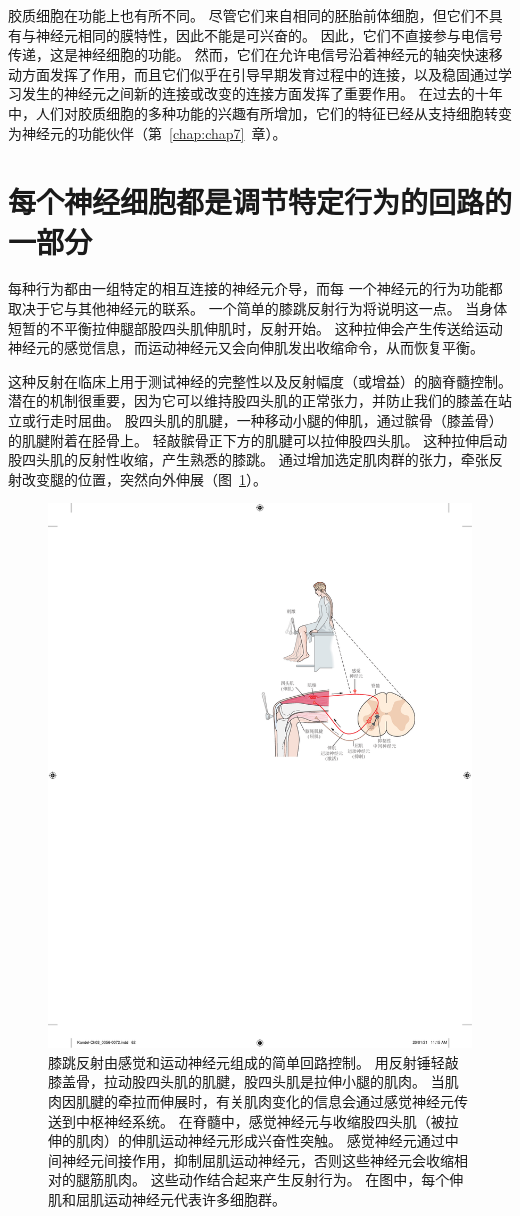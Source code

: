 胶质细胞在功能上也有所不同。
尽管它们来自相同的胚胎前体细胞，但它们不具有与神经元相同的膜特性，因此不能是可兴奋的。
因此，它们不直接参与电信号传递，这是神经细胞的功能。
然而，它们在允许电信号沿着神经元的轴突快速移动方面发挥了作用，而且它们似乎在引导早期发育过程中的连接，以及稳固通过学习发生的神经元之间新的连接或改变的连接方面发挥了重要作用。
在过去的十年中，人们对胶质细胞的多种功能的兴趣有所增加，它们的特征已经从支持细胞转变为神经元的功能伙伴（第~\ref{chap:chap7}~章）。



\section{每个神经细胞都是调节特定行为的回路的一部分}

每种行为都由一组特定的相互连接的神经元介导，而每
一个神经元的行为功能都取决于它与其他神经元的联系。
一个简单的膝跳反射行为将说明这一点。 
当身体短暂的不平衡拉伸腿部股四头肌伸肌时，反射开始。
这种拉伸会产生传送给运动神经元的感觉信息，而运动神经元又会向伸肌发出收缩命令，从而恢复平衡。


这种反射在临床上用于测试神经的完整性以及反射幅度（或增益）的脑脊髓控制。 
潜在的机制很重要，因为它可以维持股四头肌的正常张力，并防止我们的膝盖在站立或行走时屈曲。 
股四头肌的肌腱，一种移动小腿的伸肌，通过髌骨（膝盖骨）的肌腱附着在胫骨上。 
轻敲髌骨正下方的肌腱可以拉伸股四头肌。 
这种拉伸启动股四头肌的反射性收缩，产生熟悉的膝跳。 
通过增加选定肌肉群的张力，牵张反射改变腿的位置，突然向外伸展（图~\ref{fig:3_5}）。

\begin{figure}[htbp]
	\centering
	\includegraphics[width=0.65\linewidth]{chap03/fig_3_5}
	\caption{膝跳反射由感觉和运动神经元组成的简单回路控制。
		用反射锤轻敲膝盖骨，拉动股四头肌的肌腱，股四头肌是拉伸小腿的肌肉。
		当肌肉因肌腱的牵拉而伸展时，有关肌肉变化的信息会通过感觉神经元传送到中枢神经系统。
		在脊髓中，感觉神经元与收缩股四头肌（被拉伸的肌肉）的伸肌运动神经元形成兴奋性突触。 
		感觉神经元通过中间神经元间接作用，抑制屈肌运动神经元，否则这些神经元会收缩相对的腿筋肌肉。 
		这些动作结合起来产生反射行为。 
		在图中，每个伸肌和屈肌运动神经元代表许多细胞群。}
	\label{fig:3_5}
\end{figure}


